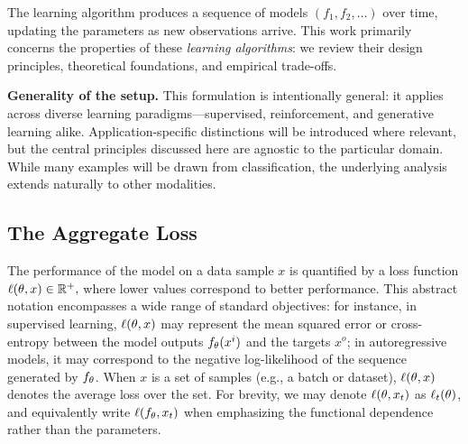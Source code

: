 \documentclass[10pt]{article} %
\begin{document}
The learning algorithm produces a sequence of models $(f_1, f_2, \dots)$ over time, updating the parameters as new observations arrive.  
This work primarily concerns the properties of these \emph{learning algorithms}: we review their design principles, theoretical foundations, and empirical trade-offs.

\vspace{0.5em}
\noindent\textbf{Generality of the setup.}
This formulation is intentionally general: it applies across diverse learning paradigms—supervised, reinforcement, and generative learning alike.  
Application-specific distinctions will be introduced where relevant, but the central principles discussed here are agnostic to the particular domain.  
While many examples will be drawn from classification, the underlying analysis extends naturally to other modalities.

\subsection{The Aggregate Loss}
\label{ssec:multi-task-loss}

The performance of the model on a data sample $x$ is quantified by a loss function
\(
\ell(\theta, x) \in \mathbb{R}^+,
\)
where lower values correspond to better performance.  
This abstract notation encompasses a wide range of standard objectives: for instance, in supervised learning, $\ell(\theta, x)$ may represent the mean squared error or cross-entropy between the model outputs $f_\theta(x^i)$ and the targets $x^o$; in autoregressive models, it may correspond to the negative log-likelihood of the sequence generated by $f_\theta$.  
When $x$ is a set of samples (e.g., a batch or dataset), $\ell(\theta, x)$ denotes the average loss over the set.
For brevity, we may denote $\ell(\theta, x_t)$ as $\ell_t(\theta)$, and equivalently write $\ell(f_\theta, x_t)$ when emphasizing the functional dependence rather than the parameters.
\end{document}
